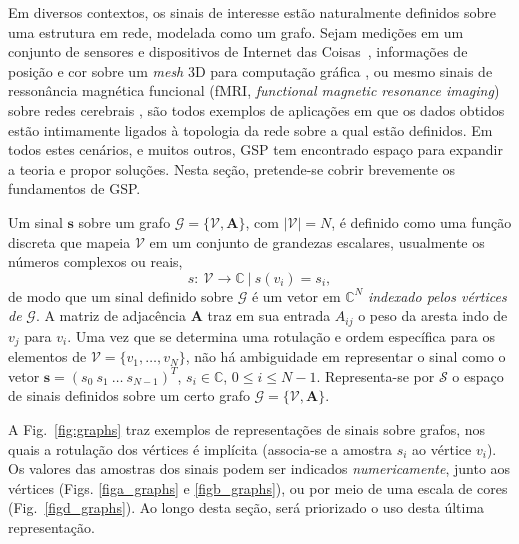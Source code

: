 Em diversos contextos, os sinais de interesse est\~ao naturalmente definidos sobre uma estrutura em rede, modelada como um grafo. Sejam medi\c{c}\~oes em um conjunto de sensores e dispositivos de Internet das Coisas~\cite{alam2015toward,guo2016qos,ma2016non,yu2016novel}, informa\c c\~oes de posi\c c\~ao e cor sobre um \emph{mesh} 3D para computa\c c\~ao gr\'afica \cite{nguyen2014compression}, ou mesmo sinais de resson\^ancia magn\'etica funcional (fMRI, \emph{functional magnetic resonance imaging}) sobre redes cerebrais \cite{goldsberry2017brain,leonardi2013tight}, s\~ao todos exemplos de aplica\c c\~oes em que os dados obtidos est\~ao intimamente ligados \`a topologia da rede sobre a qual est\~ao definidos. Em todos estes cen\'arios, e muitos outros, GSP tem encontrado espa\c co para expandir a teoria e propor solu\c c\~oes. Nesta se\c c\~ao, pretende-se cobrir brevemente os fundamentos de GSP.


Um sinal $ \mathbf{s} $ sobre um grafo $ \mathcal{G} = \{\mathcal{V}, \mathbf{A}\} $, com $ |\mathcal{V}| = N $, \'e definido como uma fun\c c\~ao discreta que mapeia $\mathcal{V}$ em um conjunto de grandezas escalares, usualmente os n\'umeros complexos ou reais,
\begin{equation}
s: \ \mathcal{V} \rightarrow \mathbb{C} \ | \ s(v_i) = s_i,
\end{equation}
de modo que um sinal definido sobre $ \mathcal{G} $ \'e um vetor em $ \mathbb{C}^N $ \emph{indexado pelos v\'ertices de} $ \mathcal{G} $. A matriz de adjac\^encia $ \mathbf{A} $ traz em sua entrada $ A_{ij} $ o peso da aresta indo de $ v_j $ para $ v_i $. Uma vez que se determina uma rotula\c c\~ao e ordem espec\'ifica para os elementos de $ \mathcal{V} = \{v_1, \dots, v_N\}$, n\~ao h\'a ambiguidade em representar o sinal como o vetor $ \mathbf{s} = (s_0 \ s_1 \ \dots \ s_{N-1})^T$, $ s_i \in \mathbb{C} $, $ 0 \leq i \leq N-1 $. Representa-se por $ \mathcal{S} $ o espa\c co de sinais definidos sobre um certo grafo $ \mathcal{G} = \{\mathcal{V}, \mathbf{A}\} $.

A Fig.~\ref{fig:graphs} traz exemplos de representa\c c\~oes de sinais sobre grafos, nos quais a rotula\c c\~ao dos v\'ertices \'e impl\'icita (associa-se a amostra $ s_i $ ao v\'ertice $ v_i $). Os valores das amostras dos sinais podem ser indicados \emph{numericamente}, junto aos v\'ertices (Figs. \ref{figa_graphs} e \ref{figb_graphs}), ou por meio de uma escala de cores (Fig.~\ref{figd_graphs}). Ao longo desta se\c c\~ao, ser\'a priorizado o uso desta \'ultima representa\c{c}\~ao.%

